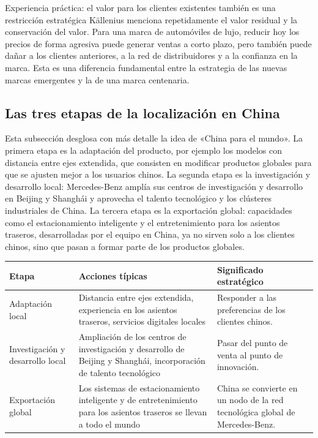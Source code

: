 \begin{importantbox}{Experiencia práctica: el valor para los clientes existentes también es una restricción estratégica}
Källenius menciona repetidamente el valor residual y la conservación del valor. Para una marca de automóviles de lujo, reducir hoy los precios de forma agresiva puede generar ventas a corto plazo, pero también puede dañar a los clientes anteriores, a la red de distribuidores y a la confianza en la marca. Esta es una diferencia fundamental entre la estrategia de las nuevas marcas emergentes y la de una marca centenaria.
\end{importantbox}

\subsection{Las tres etapas de la localización en China}

Esta subsección desglosa con más detalle la idea de «China para el mundo». La primera etapa es la adaptación del producto, por ejemplo los modelos con distancia entre ejes extendida, que consisten en modificar productos globales para que se ajusten mejor a los usuarios chinos. La segunda etapa es la investigación y desarrollo local: Mercedes-Benz amplía sus centros de investigación y desarrollo en Beijing y Shanghái y aprovecha el talento tecnológico y los clústeres industriales de China. La tercera etapa es la exportación global: capacidades como el estacionamiento inteligente y el entretenimiento para los asientos traseros, desarrolladas por el equipo en China, ya no sirven solo a los clientes chinos, sino que pasan a formar parte de los productos globales.

\noindent\begin{tabularx}{\textwidth}{p{}p{}X}
\toprule
Etapa & Acciones típicas & Significado estratégico \\
\midrule
Adaptación local & Distancia entre ejes extendida, experiencia en los asientos traseros, servicios digitales locales & Responder a las preferencias de los clientes chinos. \\
Investigación y desarrollo local & Ampliación de los centros de investigación y desarrollo de Beijing y Shanghái, incorporación de talento tecnológico & Pasar del punto de venta al punto de innovación. \\
Exportación global & Los sistemas de estacionamiento inteligente y de entretenimiento para los asientos traseros se llevan a todo el mundo & China se convierte en un nodo de la red tecnológica global de Mercedes-Benz. \\
\bottomrule
\end{tabularx}

